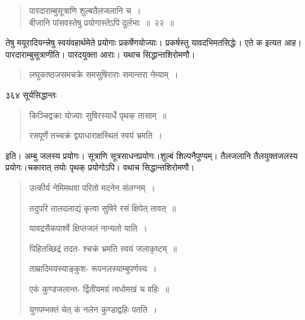 \documentclass[11pt, openany]{book}
\begin{document}

 \begin{quote}
{\ssi पारदाराम्बुसूत्राणि शुल्बतैलजलानि च~।\\
बीजानि पांसवस्तेषु प्रयोगास्तेऽपि दुर्लभाः~॥~२२~॥}
\end{quote}
 तेषु मयूरादियन्त्त्रेषु स्वयंवहार्थमेते प्रयोगाः प्रकर्षेणयोज्याः। प्रकर्षस्तु यावदभिमतसिद्धेः। एते क इत्यत आह।पारदाराम्बुसूत्राणीति। पारदयुक्ता आराः। यथाच सिद्धान्तशिरोमणौ। 

\begin{quote}
{\qt लघुकाष्ठजसमचक्रे
समसुषिराराः समान्तरा नेम्याम्~।}
\end{quote}





\newpage


\noindent ३६४ \hspace{4cm} सूर्यसिद्धान्तः
\vspace{1cm}

 \begin{quote}
{\qt किञ्चिद्वक्रा योज्याः
 सुषिरस्यार्धे पृथक् तासाम्~॥

रसपूर्णे तच्चक्रं
द्व्याधाराक्षस्थितं स्वयं भ्रमति~। }
\end{quote}
इति। अम्बु जलस्य प्रयोगः। सूत्राणि सूत्रसाधनप्रयोगः।शुल्बं शिल्पनैपुण्यम्। तैलजलानि तैलयुक्तजलस्य प्रयोगः।चकारात् तयोः पृथक् प्रयोगोऽपि। वथाच सिद्धान्तशिरोमणौ। 


 \begin{quote}
{\qt उत्कीर्य नेमिमथवा
 परितो मदनेन संलग्नम्~।

तदुपरि तालदलाद्यं
कृत्वा सुषिरे रसं क्षिपेत् तावत्~॥

यावद्रसैकपार्श्वे
क्षिप्तजलं नान्यतो याति~।

पिहितच्छिद्रं तदत-
श्चक्रं भ्रमति स्वयं जलाकृष्टम्~॥

ताम्रादिमयस्याङ्कुश-
रूपनलस्याम्बुपर्णस्य~।

एकं कुण्डजलान्त-
र्द्वितीयमग्रं त्वधोमखं च वहिः~॥

युगपम्भक्तं चेत् कं
नलेन कुण्डाद्वहिः पतति~।}
\end{quote}
\end{document}
